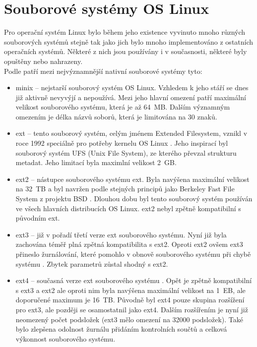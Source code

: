 \chapter{Souborové systémy OS Linux}
Pro operační systém Linux bylo během jeho existence vyvinuto mnoho různých souborových systémů stejně tak jako jich bylo mnoho implementováno z ostatních operačních systémů. Některé z nich jsou používány i v současnosti, některé byly opuštěny nebo nahrazeny.\\
Podle \cite{tldp-filesystem} patří mezi nejvýznamnější nativní souborové systémy tyto:
\begin{itemize}
    \item minix -- nejstarší souborový systém OS Linux. Vzhledem k jeho stáří se dnes již aktivně nevyvýjí a nepoužívá. Mezi jeho hlavní omezení patří maximální velikost souborového systému, která je až 64~MB. Dalším významným omezením je délka názvů soborů, která je limitována na 30 znaků.
    \item ext -- tento souborový systém, celým jménem Extended Filesystem, vznikl v roce 1992 speciálně pro potřeby kernelu OS Linux \cite{wiki-ext}. Jeho inspirací byl souborový systém UFS (Unix File System), ze kterého převzal strukturu metadat. Jeho limitací byla maximlní velikost 2~GB.
    \item ext2 -- nástupce souborového systému ext. Byla navýšena maximální velikost na 32~TB a byl navržen podle stejných principů jako Berkeley Fast File System z projektu BSD \cite{wiki-ext2}. Dlouhou dobu byl tento souborový systém používán ve všech hlavních distribucích OS Linux. ext2 nebyl zpětně kompatibilní s původním ext.
    \item ext3 -- již v pořadí třetí verze ext souborového systému. Nyní již byla zachována téměř plná zpětná kompatibilita s ext2. Oproti ext2 ovšem ext3 přineslo žurnálování, které pomohlo v obnově souborového systému při chybě systému \cite{wiki-ext3}. Zbytek parametrů zůstal shodný s ext2.
    \item ext4 -- současná verze ext souborového systému \cite{wiki-ext4}. Opět je zpětně kompatibilní s ext3 a ext2 ale oproti nim byla navýšena maximální velikost na 1~EB, ale doporučené maximum je 16~TB. Původně byl ext4 pouze skupina rozšížení pro ext3, ale později se osamostatnil jako ext4. Dalším rozšířením je nyní již neomezený počet podsložek (ext3 mělo omezení na 32000 podsložek). Také bylo zlepšena odolnost žurnálu přidáním kontrolních součtů a celková výkonnost souborového systému.

\end{itemize}
